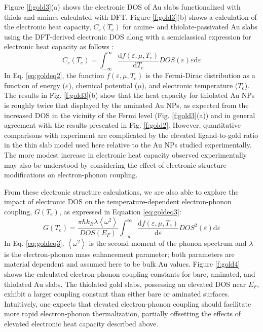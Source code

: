 Figure \ref{f:gold3}(a) shows the electronic DOS of Au slabs functionalized with thiols and amines calculated with DFT. Figure \ref{f:gold3}(b) shows a calculation of the electronic heat capacity, $C_e(T_e)$ for amine- and thiolate-passivated Au slabs using the DFT-derived electronic DOS along with a semiclassical expression for electronic heat capacity as follows \cite{lin2008electron}:
\begin{equation}\label{eq:goldeq2}
C_e(T_e) = \int_{-\infty}^{\infty}\frac{\mathrm{d}f(\varepsilon,\mu,T_e)}{\mathrm{d}T_e}DOS(\varepsilon)\varepsilon\mathrm{d}\varepsilon
\end{equation}
In Eq. \ref{eq:goldeq2}, the function $f(\varepsilon, \mu, T_e)$ is the Fermi-Dirac distribution as a function of energy ($\varepsilon$), chemical potential ($\mu$), and electronic temperature ($T_e$). The results in Fig. \ref{f:gold3}(b) show that the heat capacity for thiolated Au NPs is roughly twice that displayed by the aminated Au NPs, as expected from the increased DOS in the vicinity of the Fermi level (Fig. \ref{f:gold3}(a)) and in general agreement with the results presented in Fig. \ref{f:gold2}. However, quantitative comparisons with experiment are complicated by the elevated ligand-to-gold ratio in the thin slab model used here relative to the Au NPs studied experimentally. The more modest increase in electronic heat capacity observed experimentally may also be understood by considering the effect of electronic structure modifications on electron-phonon coupling. \par

From these electronic structure calculations, we are also able to explore the impact of electronic DOS on the temperature-dependent electron-phonon coupling, $G(T_e)$, as expressed in Equation \ref{eq:goldeq3}:
\begin{equation}\label{eq:goldeq3}
G(T_e) = \frac{\pi\hbar k_B\lambda\left\langle\omega^2\right\rangle}{DOS(E_F)}\int_{-\infty}^{\infty}\frac{\mathrm{d}f(\varepsilon,\mu,T_e)}{\mathrm{d}\varepsilon}DOS^2(\varepsilon)\mathrm{d}\varepsilon
\end{equation}
In Eq. \ref{eq:goldeq3}, $\left\langle\omega^2\right\rangle$ is the second moment of the phonon spectrum and $\lambda$ is the electron-phonon mass enhancement parameter; both parameters are material dependent and assumed here to be bulk Au values. Figure \ref{f:gold4} shows the calculated electron-phonon coupling constants for bare, aminated, and thiolated Au slabs. The thiolated gold slabs, possessing an elevated DOS near $E_F$, exhibit a larger coupling constant than either bare or aminated surfaces. Intuitively, one expects that elevated electron-phonon coupling should facilitate more rapid electron-phonon thermalization, partially offsetting the effects of elevated electronic heat capacity described above.

